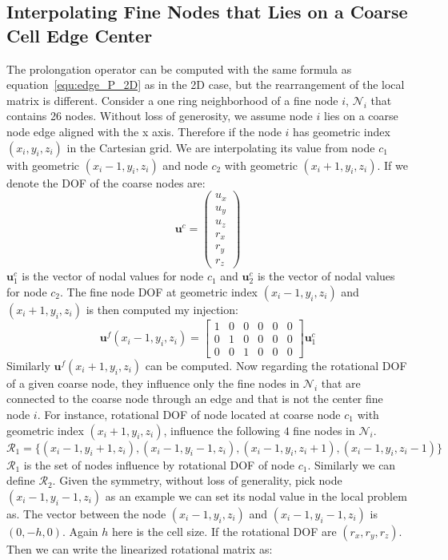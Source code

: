 \subsection{Interpolating Fine Nodes that Lies on a Coarse Cell Edge Center}
The prolongation operator can be computed with the same formula as equation~\ref{equ:edge_P_2D} as in the 2D case, but the rearrangement of the local matrix is different. Consider a one ring neighborhood of a fine node $i$, $\mathcal{N}_i$ that contains 26 nodes. Without loss of generosity, we assume node $i$ lies on a coarse node edge aligned with the x axis. Therefore if the node $i$ has geometric index $(x_i, y_i, z_i)$ in the Cartesian grid. We are interpolating its value from node $c_1$ with geometric $(x_i - 1, y_i, z_i)$ and node $c_2$ with geometric $(x_i + 1, y_i, z_i)$. If we denote the DOF of the coarse nodes are:
$$
\mathbf{u}^c = \left(\begin{array}{c}u_x\\u_y\\u_z\\r_x\\r_y\\r_z\end{array}\right)
$$
$\mathbf{u}^c_1$ is the vector of nodal values for node $c_1$ and $\mathbf{u}^c_2$ is the vector of nodal values for node $c_2$. The fine node DOF at geometric index $(x_i - 1, y_i, z_i)$ and $(x_i + 1, y_i, z_i)$ is then computed my injection:
 \begin{equation}
 \mathbf{u}^f(x_i - 1, y_i, z_i) = \begin{bmatrix} 
 1 & 0 & 0 & 0 & 0 & 0\\
 0 & 1 & 0 & 0 & 0 & 0\\
 0 & 0 & 1 & 0 & 0 & 0 \end{bmatrix} \mathbf{u}^c_1
 \end{equation}
 Similarly $\mathbf{u}^f(x_i + 1, y_i, z_i)$ can be computed. Now regarding the rotational DOF of a given coarse node, they influence only the fine nodes in $\mathcal{N}_i$ that are connected to the coarse node through an edge and that is not the center fine node $i$. For instance, rotational DOF of node located at coarse node $c_1$ with geometric index $(x_i + 1, y_i, z_i)$, influence the following $4$ fine nodes in $\mathcal{N}_i$.
 \begin{equation}
 \mathcal{R}_1 = \{(x_i - 1, y_i+1, z_i),(x_i - 1, y_i-1, z_i),(x_i - 1, y_i, z_i+1), (x_i - 1, y_i, z_i-1)\}
 \end{equation}
$\mathcal{R}_1$ is the set of nodes influence by rotational DOF of node $c_1$. Similarly we can define $\mathcal{R}_2$. Given the symmetry, without loss of generality, pick node $(x_i - 1, y_i - 1, z_i)$ as an example we can set its nodal value in the local problem as. The vector between the node $(x_i - 1, y_i, z_i)$ and $(x_i - 1, y_i - 1, z_i)$ is $(0,-h,0)$. Again $h$ here is the cell size. If the rotational DOF are $(r_x,r_y,r_z)$. Then we can write the linearized rotational matrix as:
